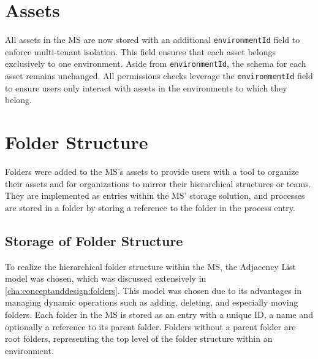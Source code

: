 %

\section{Assets}

All assets in the MS are now stored with an additional \lstinline{environmentId} field to enforce multi-tenant isolation.
This field ensures that each asset belongs exclusively to one environment.
Aside from \lstinline{environmentId}, the schema for each asset remains unchanged.
All permissions checks leverage the \lstinline{environmentId} field to ensure users only interact with assets in the environments to which they belong.



\section{Folder Structure}

Folders were added to the MS's assets to provide users with a tool to organize their assets and
for organizations to mirror their hierarchical structures or teams.
They are implemented as entries within the MS' storage solution,
and processes are stored in a folder by storing a reference to the folder in the process entry.

\subsection{Storage of Folder Structure}

To realize the hierarchical folder structure within the MS,
the Adjacency List model was chosen,
which was discussed extensively in \ref{cha:conceptanddesign:folders}.
This model was chosen due to its advantages in managing dynamic operations such as 
adding, deleting, and especially moving folders.
Each folder in the MS is stored as an entry with a unique ID, a name and optionally a reference to
its parent folder.
Folders without a parent folder are root folders, representing the top level of the folder
structure within an environment.

